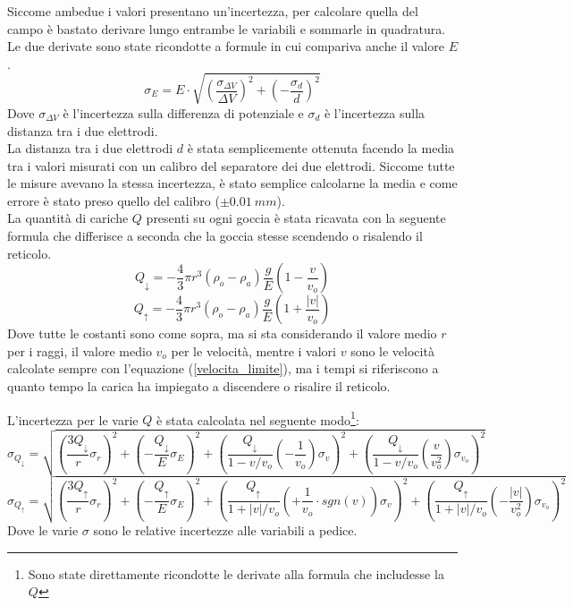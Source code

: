 \documentclass{article}
\begin{document}
Siccome ambedue i valori presentano un'incertezza, per calcolare quella del campo è bastato derivare lungo entrambe le variabili e sommarle in quadratura. Le due derivate sono state ricondotte a formule in cui compariva anche il valore $E$.
\begin{equation}
	\sigma_{E}=E\cdot\sqrt{\left(\frac{\sigma_{\Delta V}}{\Delta V}\right)^2+\left(-\frac{\sigma_d}{d}\right)^2}
\end{equation}
Dove $\sigma_{\Delta V}$ è l'incertezza sulla differenza di potenziale e $\sigma_d$ è l'incertezza sulla distanza tra i due elettrodi.\\

La distanza tra i due elettrodi $d$ è stata semplicemente ottenuta facendo la media tra i valori misurati con un calibro del separatore dei due elettrodi. Siccome tutte le misure avevano la stessa incertezza, è stato semplice calcolarne la media e come errore è stato preso quello del calibro ($\pm 0.01\ mm$).\\

La quantità di cariche $Q$ presenti su ogni goccia è stata ricavata con la seguente formula che differisce a seconda che la goccia stesse scendendo o risalendo il reticolo.
\begin{equation}
	Q_{\downarrow}=-\frac{4}{3}\pi r^3(\rho_o-\rho_a)\frac{g}{E}\left(1-\frac{v}{v_o}\right)
	\label{qsu}
\end{equation}
\begin{equation}
	Q_{\uparrow}=-\frac{4}{3}\pi r^3(\rho_o-\rho_a)\frac{g}{E}\left(1+\frac{|v|}{v_o}\right)
	\label{qgiu}
\end{equation}
Dove tutte le costanti sono come sopra, ma si sta considerando il valore medio $r$ per i raggi, il valore medio $v_o$ per le velocità, mentre i valori $v$ sono le velocità calcolate sempre con l'equazione (\ref{velocita_limite}), ma i tempi si riferiscono a quanto tempo la carica ha impiegato a discendere o risalire il reticolo.

L'incertezza per le varie $Q$ è stata calcolata nel seguente modo\footnote{Sono state direttamente ricondotte le derivate alla formula che includesse la $Q$}:
\begin{equation}
	\sigma_{Q_{\downarrow}}=\sqrt{\left(\frac{3Q_{\downarrow}}{r}\sigma_r\right)^2+\left(-\frac{Q_{\downarrow}}{E}\sigma_E\right)^2+\left(\frac{Q_{\downarrow}}{1-v/v_o}\left(-\frac{1}{v_o}\right)\sigma_v\right)^2+\left(\frac{Q_{\downarrow}}{1-v/v_o}\left(\frac{v}{v_o^2}\right)\sigma_{v_o}\right)^2}
\end{equation}
\begin{equation}
	\sigma_{Q_{\uparrow}}=\sqrt{\left(\frac{3Q_{\uparrow}}{r}\sigma_r\right)^2+\left(-\frac{Q_{\uparrow}}{E}\sigma_E\right)^2+\left(\frac{Q_{\uparrow}}{1+|v|/v_o}\left(+\frac{1}{v_o}\cdot sgn(v)\right)\sigma_v\right)^2+\left(\frac{Q_{\uparrow}}{1+|v|/v_o}\left(-\frac{|v|}{v_o^2}\right)\sigma_{v_o}\right)^2}
\end{equation}
Dove le varie $\sigma$ sono le relative incertezze alle variabili a pedice.\\
\end{document}
